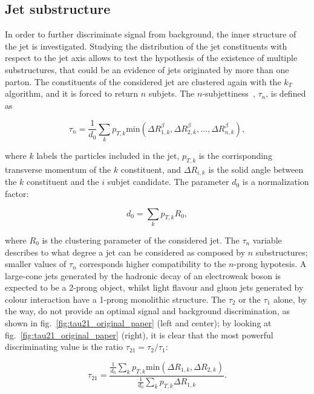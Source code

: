 \subsection{Jet substructure}\label{ssec:jetsub}

In order to further discriminate signal from background, the inner structure of the jet is investigated. Studying the distribution of the jet constituents with respect to the jet axis allows to test the hypothesis of the existence of multiple substructures, that could be an evidence of jets originated by more than one parton. The constituents of the considered jet are clustered again with the $k_T$ algorithm, and it is forced to return $n$ subjets. The $n$-subjettiness~\cite{Thaler2011}, $\tau_n$, is defined as

\begin{equation}
\tau_n = \frac{1}{d_0} \sum_k p_{T,k} \text{min} \left( \Delta R_{1,k}^\beta, \Delta R_{2,k}^\beta, \dots, \Delta R_{n,k}^\beta \right),
\label{eq:n_subjettiness_def}
\end{equation}

\noindent where $k$ labels the particles included in the jet, $p_{T,k}$ is the corrisponding transverse momentum of the $k$ constituent, and $\Delta R_{i,k}$ is the solid angle between the $k$ constituent and the $i$ subjet candidate. The parameter $d_0$ is a normalization factor:

\begin{equation}
d_0 = \sum_k p_{T,k} R_0,
\label{eq:n_subjettiness_d0}
\end{equation}

\noindent where $R_0$ is the clustering parameter of the considered jet. The $\tau_n$ variable describes to what degree a jet can be considered as composed by $n$ substructures; smaller values of $\tau_n$ corresponds higher compatibility to the $n$-prong hypotesis. A large-cone jets generated by the hadronic decay of an electroweak boson is expected to be a 2-prong object, whilst light flavour and gluon jets generated by colour interaction have a 1-prong monolithic structure. The $\tau_2$ or the $\tau_1$ alone, by the way, do not provide an optimal signal and background discrimination, as shown in fig.~\ref{fig:tau21_original_paper} (left and center); by looking at fig.~\ref{fig:tau21_original_paper} (right), it is clear that the most powerful discriminating value is the ratio $\tau_{21} = \tau_2/\tau_1$:

\begin{equation}
\tau_{21} = \frac{ \frac{1}{d_0} \sum_k p_{T,k} \text{min}( \Delta R_{1,k}, \Delta R_{2,k} ) }{ \frac{1}{d_0} \sum_k p_{T,k} \Delta R_{1,k} }.
\label{eq:21_subjettiness_def}
\end{equation}

